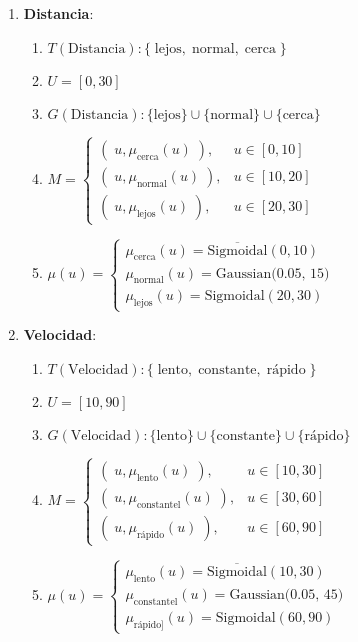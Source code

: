 \documentclass[a4paper,10pt,twocolumn]{article}
\begin{document}
\begin{enumerate}
	\item[] \textbf{Distancia}:
		\begin{enumerate}
			\item[] $T(\text{Distancia}): \{ \;\text{lejos}, \;\text{normal}, \;\text{cerca}\; \}$	
			\item[] $U = [0, 30]$
			\item[] $G(\text{Distancia}): \{\text{lejos}\} \cup \{\text{normal}\} \cup \{\text{cerca}\}$
			\item[] $M = \begin{cases}
				(\;u, \mu_{\text{cerca}} (u) \;), & u \in [0, 10] \\
				(\;u, \mu_{\text{normal}} (u) \;), & u \in [10, 20] \\
				(\;u, \mu_{\text{lejos}} (u) \;), & u \in [20, 30]
			\end{cases}$
			\item[] $\mu(u) = \begin{cases}
			\mu_{\text{cerca}} (u) = \overline{\text{Sigmoidal}}(0, 10) \\
			\mu_{\text{normal}} (u) = \text{Gaussian(0.05, 15)} \\
			\mu_{\text{lejos}} (u) = \text{Sigmoidal} (20, 30)
			\end{cases}$
		\end{enumerate}
	
	\item[] \textbf{Velocidad}:
		\begin{enumerate}
			\item[] $T(\text{Velocidad}): \{ \;\text{lento}, \;\text{constante}, \;\text{r\'apido}\; \}$
			\item[] $U = [10, 90]$
			\item[] $G(\text{Velocidad}): \{\text{lento}\} \cup \{\text{constante}\} \cup \{\text{r\'apido}\}$ 
			\item[] $M = \begin{cases}
			(\;u, \mu_{\text{lento}} (u) \;), & u \in [10, 30] \\
			(\;u, \mu_{\text{constantel}} (u) \;), & u \in [30, 60] \\
			(\;u, \mu_{\text{r\'apido}} (u) \;), & u \in [60, 90]
			\end{cases}$
			\item[] $\mu(u) = \begin{cases}
			\mu_{\text{lento}} (u) = \overline{\text{Sigmoidal}}(10, 30) \\
			\mu_{\text{constantel}} (u) = \text{Gaussian(0.05, 45)} \\
			\mu_{\text{r\'apido]}} (u) = \text{Sigmoidal} (60, 90)
			\end{cases}$
		\end{enumerate}
	

\end{enumerate}
\end{document}
